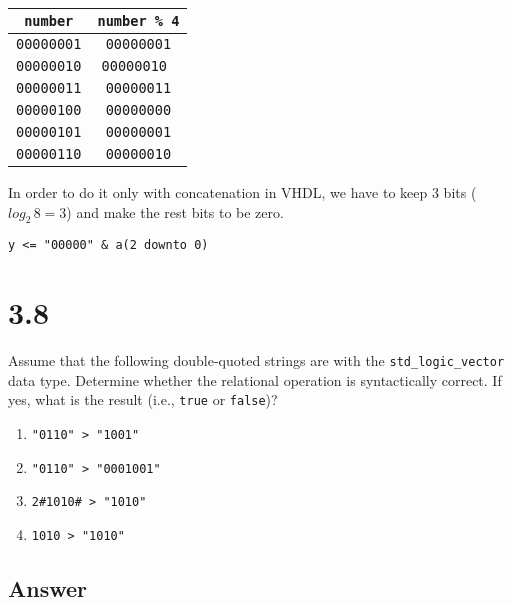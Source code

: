 \documentclass[dvipsnames, svgnames, x11names, a4paper,12pt]{article}
\begin{document}
\begin{table}[H]
\begin{center}
    \begin{tabular}{|c|c|}
        \hline
        \texttt{number} & \texttt{number \% 4} \\
        \hline
        \texttt{00000001} & \texttt{00000001} \\
        \hline
        \texttt{00000010} & \texttt{00000010 }\\
        \hline
        \texttt{00000011} & \texttt{00000011} \\
        \hline
        \texttt{00000100} & \texttt{00000000} \\
        \hline
        \texttt{00000101} & \texttt{00000001} \\
        \hline
        \texttt{00000110} & \texttt{00000010} \\
        \hline
    \end{tabular}
\end{center}
\end{table}

In order to do it only with concatenation in VHDL, we have to keep 3 bits ($log_2\, 8 = 3$) and make the rest bits to be zero.

\begin{lstlisting}
y <= "00000" & a(2 downto 0)
\end{lstlisting}
\section{3.8}    
 Assume that the following double-quoted strings are with the \texttt{std\_logic\_vector}
data type. Determine whether the relational operation is syntactically correct. If yes, what
is the result (i.e., \texttt{true} or \texttt{false})?

\begin{enumerate}[label=(\alph*)]
    \item \texttt{"0110" > "1001"}
    \item \texttt{"0110" > "0001001"}
    \item \texttt{2\#1010\# > "1010"}
    \item \texttt{1010 > "1010"}
\end{enumerate}
\subsection{Answer}
\end{document}
